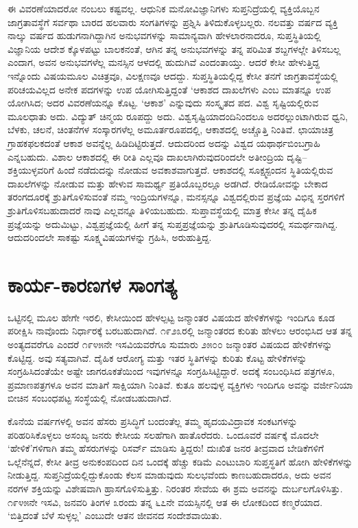 ಈ ವಿವರಣೆಯಾದರೋ ನಂಬಲು ಕಷ್ಟವಲ್ಲ. ಆಧುನಿಕ ಮನೋವಿಜ್ಞಾನಿಗಳು ಸುಪ್ತನಿದ್ರೆಯಲ್ಲಿ ವ್ಯಕ್ತಿಯೊಬ್ಬನ ಜಾಗ್ರತಾವಸ್ಥೆಗೆ ಸರ್ವಥಾ ಬಾರದ ಹಲವಾರು ಸಂಗತಿಗಳನ್ನು ಪ್ರಶ್ನಿಸಿ ತಿಳಿದುಕೊಳ್ಳಬಲ್ಲರು. ನಲವತ್ತು ವರ್ಷದ ವ್ಯಕ್ತಿ ನಾಲ್ಕು ವರ್ಷದ ಹುಡುಗನಾಗಿದ್ದಾಗಿನ ಅನುಭವಗಳನ್ನು ಸಾಮಾನ್ಯವಾಗಿ ಹೇಳಲಾರನಾದರೂ, ಸುಪ್ತಸ್ಥಿತಿಯಲ್ಲಿ ವಿಜ್ಞಾನಿಯ ಆದೇಶ ಕ್ಕೊಳಪಟ್ಟು ಬಾಲಕನಂತೆ, ಆಗಿನ ತನ್ನ ಅನುಭವಗಳನ್ನು ತನ್ನ ಪರಿಮಿತ ಶಬ್ದಗಳಲ್ಲೇ ತಿಳಿಸಬಲ್ಲ ಎಂದಾಗ, ಅವನ ಅನುಭವಗಳೆಲ್ಲ ಮನಸ್ಸಿನ ಆಳದಲ್ಲಿ ಹುದುಗಿವೆ ಎಂದಂತಾಯ್ತು. ಆದರೆ ಕೇಸೀ ಹೇಳುತ್ತಿದ್ದ ಇನ್ನೊಂದು ವಿಷಯಮೂಲ ವಿಚಿತ್ರವೂ, ವಿಲಕ್ಷಣವೂ ಆದದ್ದು. ಸುಪ್ತಸ್ಥಿತಿಯಲ್ಲಿದ್ದ ಕೇಸೀ ತನಗೆ ಜಾಗ್ರತಾವಸ್ಥೆಯಲ್ಲಿ ಪರಿಚಯವಿಲ್ಲದ ಅನೇಕ ಪದಗಳನ್ನು ಉಪ ಯೋಗಿಸುತ್ತಿದ್ದಂತೆ ‘ಆಕಾಶದ ದಾಖಲೆಗಳು ಎಂಬ ಮಾತನ್ನೂ ಉಪ ಯೋಗಿಸಿದ; ಅದರ ವಿವರಣೆಯನ್ನೂ ಕೊಟ್ಟ. ‘ಆಕಾಶ’ ಎನ್ನುವುದು ಸಂಸ್ಕೃತದ ಪದ. ವಿಶ್ವ ಸೃಷ್ಟಿಯಲ್ಲಿರುವ ಮೂಲಧಾತು ಅದು. ವಿದ್ಯುತ್ ಚಿನ್ಮಯ  ರೂಪದ್ದು ಅದು. ವಿಶ್ವಸೃಷ್ಟಿಯಾದಂದಿನಿಂದಲೂ ಅದರಲ್ಲುಂಟಾಗಿರುವ ಧ್ವನಿ, ಬೆಳಕು, ಚಲನೆ, ಚಿಂತನೆಗಳ ಸಂಸ್ಕಾರಗಳೆಲ್ಲ ಅಮೂರ್ತರೂಪದಲ್ಲಿ, ಆಕಾಶದಲ್ಲಿ ಅಚ್ಚೊತ್ತಿ ನಿಂತಿವೆ. ಛಾಯಾಚಿತ್ರ ಗ್ರಾಹಕಫಲಕದಂತೆ ಆಕಾಶ ಅವನ್ನೆಲ್ಲ ಹಿಡಿದಿಟ್ಟಿರುತ್ತದೆ. ಆದುದರಿಂದ ಅದನ್ನು ವಿಶ್ವದ ಯಥಾರ್ಥಬಿಂಬಗ್ರಾಹಿ ಎನ್ನಬಹುದು. ವಿಶಾಲ ಆಕಾಶದಲ್ಲಿ ಈ ರೀತಿ ಎಲ್ಲವೂ ದಾಖಲಾಗಿರುವುದರಿಂದಲೇ ಅತೀಂದ್ರಿಯ ದೃಷ್ಟಿ–ಶಕ್ತಿಯುಳ್ಳವರಿಗೆ ಹಿಂದೆ ನಡೆದುದನ್ನು ನೋಡುವ ಅವಕಾಶವಾಗುತ್ತದೆ. ಆಕಾಶದಲ್ಲಿ ಸೂಕ್ಷ್ಮಸ್ಪಂದನ ಸ್ಥಿತಿಯಲ್ಲಿರುವ ದಾಖಲೆಗಳನ್ನು ನೋಡುವ ಮತ್ತು ಹೇಳುವ ಸಾಮರ್ಥ್ಯ ಪ್ರತಿಯೊಬ್ಬರಲ್ಲೂ ಅಡಗಿದೆ. ರೇಡಿಯೋವನ್ನು ಬೇಕಾದ ತರಂಗದೂರಕ್ಕೆ ಶ್ರುತಿಗೊಳಿಸುವಂತೆ ನಮ್ಮ ಇಂದ್ರಿಯಗಳನ್ನೂ, ಮನಸ್ಸನ್ನೂ ವಿಶ್ವದಲ್ಲಿರುವ ಪ್ರಜ್ಞೆಯ ವಿಭಿನ್ನ ಸ್ತರಗಳಿಗೆ ಶ್ರುತಿಗೊಳಿಸಬಹುದಾದರೆ ನಾವು ಎಲ್ಲವನ್ನೂ ತಿಳಿಯಬಹುದು. ಸುಪ್ತಾವಸ್ಥೆಯಲ್ಲಿ ಮಾತ್ರ ಕೇಸೀ ತನ್ನ ದೈಹಿಕ ಪ್ರಜ್ಞೆಯನ್ನು ಅದುಮಿಟ್ಟು, ವಿಶ್ವಪ್ರಜ್ಞೆಯಲ್ಲಿ ಹೀಗೆ ತನ್ನ ಸುಪ್ತಪ್ರಜ್ಞೆಯನ್ನು ಶ್ರುತಿಗೂಡಿಸುವುದರಲ್ಲಿ ಸಮರ್ಥನಾಗಿದ್ದ. ಆದುದರಿಂದಲೇ ಸಾಕಷ್ಟು ಸೂಕ್ಷ್ಮವಿಷಯಗಳನ್ನು ಗ್ರಹಿಸಿ, ಅರುಹುತ್ತಿದ್ದ.


\section{ಕಾರ್ಯ-ಕಾರಣಗಳ ಸಾಂಗತ್ಯ}

ಒಟ್ಟಿನಲ್ಲಿ ಮೂಲ ಹೇಗೇ ಇರಲಿ, ಕೇಸೀಯಿಂದ ಹೇಳಲ್ಪಟ್ಟ ಜನ್ಮಾಂತರ ವಿಷಯದ ಹೇಳಿಕೆಗಳನ್ನು ಇಂದಿಗೂ ಕೂಡ ಪರೀಕ್ಷಿಸಿ ನಾವೊಂದು ನಿರ್ಧಾರಕ್ಕೆ ಬರಬಹುದಾಗಿದೆ. ೧೯೨೩ರಲ್ಲಿ ಜನ್ಮಾಂತರದ ಕುರಿತು ಹೇಳಲು ಆರಂಭಿಸಿದ ಆತ ತನ್ನ ಅಂತ್ಯದವರೆಗೂ ಎಂದರೆ ೧೯೪೫ನೇ ಇಸವಿಯವರೆಗೂ ಸುಮಾರು ೨೫೦೦ ಜನ್ಮಾಂತರ ವಿಷಯದ ಹೇಳಿಕೆಗಳನ್ನು ಕೊಟ್ಟಿದ್ದ. ಅವು ಸತ್ಯವಾಗಿವೆ. ದೈಹಿಕ ಆರೋಗ್ಯ ಮತ್ತು ಇತರ ಸ್ಥಿತಿಗಳನ್ನು ಕುರಿತು ಕೊಟ್ಟ ಹೇಳಿಕೆಗಳನ್ನು ಸಂಗ್ರಹಿಸಿದಂತೆಯೇ ಅಷ್ಟೇ ಜಾಗರೂಕತೆಯಿಂದ ಇವುಗಳನ್ನೂ ಸಂಗ್ರಹಿಸಿಟ್ಟಿದ್ದಾರೆ. ಅದಕ್ಕೆ ಸಂಬಂಧಿಸಿದ ಪತ್ರಗಳೂ, ಪ್ರಮಾಣಪತ್ರಗಳೂ ಅವನ ಮಾತಿಗೆ ಸಾಕ್ಷಿಯಾಗಿ ನಿಂತಿವೆ. ಕುತೂ ಹಲವುಳ್ಳ ವ್ಯಕ್ತಿಗಳು ಇಂದಿಗೂ ಅವನ್ನು ವರ್ಜೀನಿಯಾ ಬೀಚಿನ ಸಂಬಂಧಪಟ್ಟ ಸಂಸ್ಥೆಯಲ್ಲಿ ನೋಡಬಹುದಾಗಿದೆ.

ಕೊನೆಯ ವರ್ಷಗಳಲ್ಲಿ ಅವನ ಹೆಸರು ಪ್ರಸಿದ್ಧಿಗೆ ಬಂದಂತೆಲ್ಲ ತಮ್ಮ ಹೃದಯವಿದ್ರಾವಕ ಸಂಕಟಗಳನ್ನು ಪರಿಹರಿಸಿಕೊಳ್ಳಲು ಅಸಂಖ್ಯ ಜನರು ಕೇಸೀಯ ಸಲಹೆಗಾಗಿ ಹಾತೊರೆದರು. ಒಂದೂವರೆ ವರ್ಷಕ್ಕೆ ಮೊದಲೇ ‘ಹೇಳಿಕೆ’ಗಳಿಗಾಗಿ ತಮ್ಮ ಹೆಸರುಗಳನ್ನು ರಿಸರ್ವ್ ಮಾಡಿಸು ತ್ತಿದ್ದರು! ದುಃಖಿತ ಜನರ ತೀವ್ರವಾದ ಬೇಡಿಕೆಗಳಿಗೆ ಒಲ್ಲೆನೆನ್ನದೆ, ಕೇಸೀ ತೀವ್ರ ಅನುಕಂಪದಿಂದ ದಿನ ಒಂದಕ್ಕೆ ಹೆಚ್ಚು ಕಡಿಮೆ ಎಂಟುಬಾರಿ ಸುಪ್ತಸ್ಥತಿಗೆ ಹೋಗಿ ಹೇಳಿಕೆಗಳನ್ನು ನೀಡುತ್ತಿದ್ದ. ಸುಪ್ತನಿದ್ರೆಯಲ್ಲಿದ್ದುಕೊಂಡು ಕೆಲಸ ಮಾಡುವುದು ಸುಲಭವೆಂದು ಕಾಣಬಹುದಾದರೂ, ಅದು ಅವನ ನರಗಳ ಶಕ್ತಿಯನ್ನು ವಿಶೇಷವಾಗಿ ಹ್ರಾಸಗೊಳಿಸುತ್ತಿತ್ತು. ನಿರಂತರ ಸೇವೆಯ ಈ ಶ್ರಮ ಅವನನ್ನು ದುರ್ಬಲಗೊಳಿಸಿತ್ತು. ೧೯೪೫ನೇ ಇಸವಿ, ಜನವರಿ ತಿಂಗಳ ೩ರಂದು ತನ್ನ ೬೭ನೇ ವಯಸ್ಸಿನಲ್ಲಿ ಆತ ಈ ಲೋಕದಿಂದ ಕಣ್ಮರೆಯಾದ. ‘ಬಿತ್ತಿದಂತೆ ಬೆಳೆ ಸುಳ್ಳಲ್ಲ’ ಎಂಬುದೇ ಆತನ ಜೀವನದ ಸಂದೇಶವಾಯಿತು.

